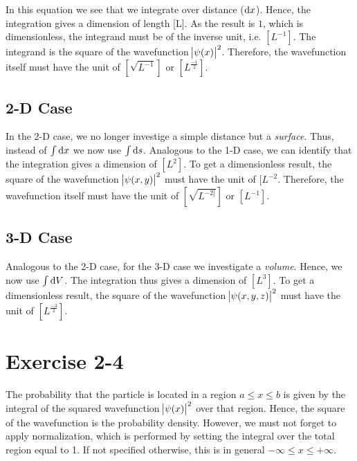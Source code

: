 In this equation we see that we integrate over distance ($\dif x$). Hence,
the integration gives a dimension of length [L]. As the result is $1$,
which is dimensionless, the integrand must be of the inverse
unit, i.e. $[L^{-1}]$. The integrand is the square of the wavefunction
$\abs{\psi(x)}^2$. Therefore, the wavefunction itself must have the unit of
$[\sqrt{L^{-1}}]$ or $[L^{\frac{-1}{2}}]$.

\subsection{2-D Case}
In the 2-D case, we no longer investige a simple distance but a \emph{surface}.
Thus, instead of $\int \dif x$ we now use $\int \dif s$. Analogous to the
1-D case, we can identify that the integration gives a dimension of $[L^2]$.
To get a dimensionless result, the square of the wavefunction
$\abs{\psi(x,y)}^2$ must have the unit of $[L^{-2}$. Therefore, the
wavefunction itself must have the unit of $[\sqrt{L^{-2]}}]$ or $[L^{-1}]$.

\subsection{3-D Case}
Analogous to the 2-D case, for the 3-D case we investigate a \emph{volume}.
Hence, we now use $\int \dif V$. The integration thus gives a dimension of
$[L^3]$. To get a dimensionless result, the square of the wavefunction
$\abs{\psi(x,y,z)}^2$ must have the unit of $[L^{\frac{-3}{2}}]$.


\section{Exercise 2-4}
The probability that the particle is located in a region $a \leq x \leq b$ is
given by the integral of the squared wavefunction $\abs{\psi(x)}^2$ over that
region. Hence, the square of the wavefunction is the probability density.
However, we must not forget to apply normalization, which is performed by
setting the integral over the total region equal to 1. If not specified
otherwise, this is in general $-\infty \leq x \leq +\infty$.

